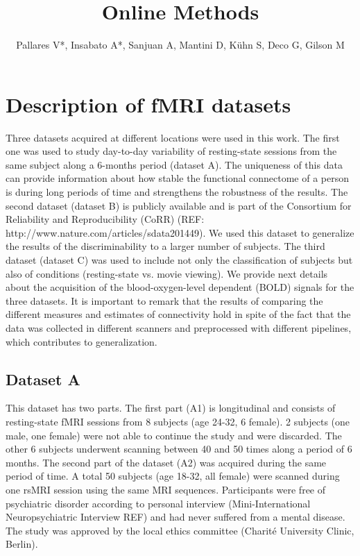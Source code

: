 \documentclass{article}
\begin{document}
\title{Online Methods}

\author{Pallares V*, Insabato A*, Sanjuan A, Mantini D, K{\"u}hn S, Deco G, Gilson M}

\maketitle

\section{Description of fMRI datasets}

Three datasets acquired at different locations were used in this work. The first one was used to study day-to-day variability of resting-state sessions from the same subject along a 6-months period (dataset A). The uniqueness of this data can provide information about how stable the functional connectome of a person is during long periods of time and strengthens the robustness of the results. The second dataset (dataset B) is publicly available and is part of the Consortium for Reliability and Reproducibility (CoRR) (REF: http://www.nature.com/articles/sdata201449). We used this dataset to generalize the results of the discriminability to a larger number of subjects. The third dataset (dataset C) was used to include not only the classification of subjects but also of conditions (resting-state vs. movie viewing). We provide next details about the acquisition of the blood-oxygen-level dependent (BOLD) signals for the three datasets. It is important to remark that the results of comparing the different measures and estimates of connectivity hold in spite of the fact that the data was collected in different scanners and preprocessed with different pipelines, which contributes to generalization. 

\subsection{Dataset A}

This dataset has two parts. The first part (A1) is longitudinal and consists of resting-state fMRI sessions from 8 subjects (age 24-32, 6 female). 2 subjects (one male, one female) were not able to continue the study and were discarded. The other 6 subjects underwent scanning between 40 and 50 times along a period of 6 months. The second part of the dataset (A2) was acquired during the same period of time. A total 50 subjects (age 18-32, all female) were scanned during one rsMRI session using the same MRI sequences. Participants were free of psychiatric disorder according to personal interview (Mini-International Neuropsychiatric Interview REF) and had never suffered from a mental disease. The study was approved by the local ethics committee (Charit{\'e} University Clinic, Berlin). 
\end{document}
